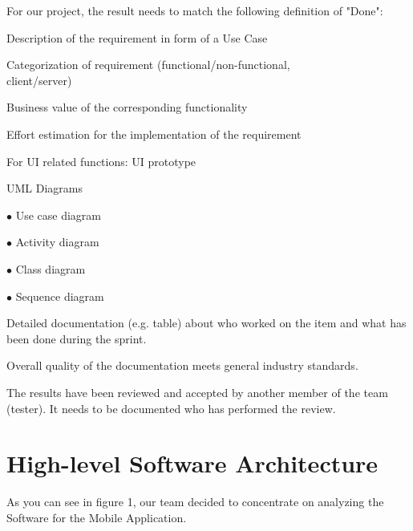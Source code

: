 \documentclass[a4paper, 12pt]{article}
\begin{document}
For our project, the result needs to match the following definition of "Done":

\begin{todolist}
\item Description of the requirement in form of a Use Case
\item Categorization of requirement (functional/non-functional,\\
      client/server)
\item Business value of the corresponding functionality
\item Effort estimation for the implementation of the requirement
\item For UI related functions: UI prototype
\item UML Diagrams 

    $\bullet$ Use case diagram
    
    $\bullet$ Activity diagram
    
    $\bullet$ Class diagram
    
    $\bullet$ Sequence diagram
    
\item Detailed documentation (e.g. table) about who worked on the item and what has been done during the sprint.
\item Overall quality of the documentation meets general industry standards.
\item The results have been reviewed and accepted by another member of the team (tester). It needs to be documented who has performed the review.
\end{todolist}
\newpage
\section{High-level Software Architecture}
As you can see in figure 1, our team decided to concentrate on analyzing the Software for the Mobile Application.
\end{document}

